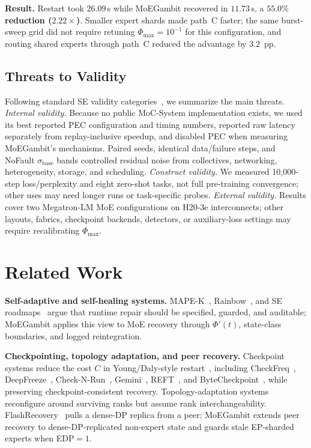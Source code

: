 \documentclass[10pt,conference]{IEEEtran}
\begin{document}
\textbf{Result.} Restart took $26.09$\,s while MoEGambit recovered in $11.73$\,s, a \textbf{$55.0\%$ reduction ($2.22\times$)}. Smaller expert shards made path~C faster; the same burst-sweep grid did not require retuning $\Phi_{\max}=10^{-1}$ for this configuration, and routing shared experts through path~C reduced the advantage by $3.2$~pp.

\subsection{Threats to Validity}\label{sec:threats}

Following standard SE validity categories~\cite{wohlin2012ese}, we summarize the main threats. \emph{Internal validity.} Because no public MoC-System implementation exists, we used its best reported PEC configuration and timing numbers, reported raw latency separately from replay-inclusive speedup, and disabled PEC when measuring MoEGambit's mechanisms. Paired seeds, identical data/failure steps, and NoFault $\sigma_{\text{base}}$ bands controlled residual noise from collectives, networking, heterogeneity, storage, and scheduling. \emph{Construct validity.} We measured 10{,}000-step loss/perplexity and eight zero-shot tasks, not full pre-training convergence; other uses may need longer runs or task-specific probes. \emph{External validity.} Results cover two Megatron-LM MoE configurations on H20-3e interconnects; other layouts, fabrics, checkpoint backends, detectors, or auxiliary-loss settings may require recalibrating $\Phi_{\max}$.

\section{Related Work}
\label{sec:related}

\textbf{Self-adaptive and self-healing systems.} MAPE-K~\cite{kephart2003autonomic}, Rainbow~\cite{garlan2004rainbow}, and SE roadmaps~\cite{cheng2009software,weyns2019softwareengineering} argue that runtime repair should be specified, guarded, and auditable; MoEGambit applies this view to MoE recovery through $\Phi'(t)$, state-class boundaries, and logged reintegration.

\textbf{Checkpointing, topology adaptation, and peer recovery.} Checkpoint systems reduce the cost $C$ in Young/Daly-style restart~\cite{young1974first,daly2006higher}, including CheckFreq~\cite{mohan2021checkfreq}, DeepFreeze~\cite{nicolae2020deepfreeze}, Check-N-Run~\cite{eisenman2022check}, Gemini~\cite{wang2023gemini}, REFT~\cite{wang2024reft}, and ByteCheckpoint~\cite{wan2024bytecheckpoint}, while preserving checkpoint-consistent recovery. Topology-adaptation systems~\cite{thorpe2023bamboo,jang2023oobleck,gandhi2024recycle,athlur2022varuna,duan2024parcae,qiao2018litz} reconfigure around surviving ranks but assume rank interchangeability. FlashRecovery~\cite{zhang2025flashrecovery} pulls a dense-DP replica from a peer; MoEGambit extends peer recovery to dense-DP-replicated non-expert state and guards stale EP-sharded experts when EDP$=1$.
\end{document}
